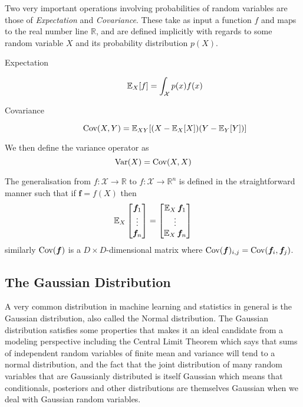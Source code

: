 Two very important operations involving probabilities of random variables are
those of \textit{Expectation} and \textit{Covariance}. These take as input a
function $f$ and maps to the real number line $\mathbb{R}$, and are defined
implicitly with regards to some random variable $X$ and its 
probability distribution $p(X)$.
\begin{description}
\item[Expectation]
  \begin{equation}
    \label{eq:expectation}
    \operatorname{\mathbb{E}}_X[f] = \int_{\mathcal{X}} p(x)f(x)
  \end{equation}
\item[Covariance]
  \begin{equation}
    \label{eq:covariance}
    \operatorname{\text{Cov}}(X, Y) = \operatorname{\mathbb{E}}_{XY}[(X - \operatorname{\mathbb{E}}_X[X])(Y - \operatorname{\mathbb{E}}_Y[Y])]
  \end{equation}
\end{description}
We then define the variance operator as
\begin{equation}
  \operatorname{\text{Var}}(X) = \operatorname{\text{Cov}}(X, X)
\end{equation}

The generalisation from $f: \mathcal{X} \to \mathbb{R}$ to $f: \mathcal{X} \to
\mathbb{R}^n$ is defined in the straightforward manner such that if $\bm{f} =
f(X)$ then
\begin{equation*}
  \operatorname{\mathbb{E}}_X
  \begin{bmatrix}
    \bm{f}_1 \\
    \vdots \\
    \bm{f}_n \\
  \end{bmatrix} =
  \begin{bmatrix}
    \operatorname{\mathbb{E}}_X \bm{f}_1 \\
    \vdots \\
    \operatorname{\mathbb{E}}_X \bm{f}_n \\
  \end{bmatrix}
\end{equation*}
similarly $\operatorname{\text{Cov}}(\bm{f})$ is a $D \times D$-dimensional matrix where
$\operatorname{\text{Cov}}(\bm{f})_{i,j} = \operatorname{\text{Cov}}(\bm{f}_i, \bm{f}_j)$.

\subsection{The Gaussian Distribution}
A very common distribution in machine learning and statistics in general is the
Gaussian distribution, also called the Normal distribution. The Gaussian
distribution satisfies some properties that makes it an ideal candidate from a
modeling perspective including the Central Limit Theorem which says that sums of
independent random variables of finite mean and variance will tend to a normal
distribution, and the fact that the joint distribution of many random variables
that are Gaussianly distributed is itself Gaussian which means that
conditionals, posteriors and other distributions are themselves Gaussian when we
deal with Gaussian random variables.

